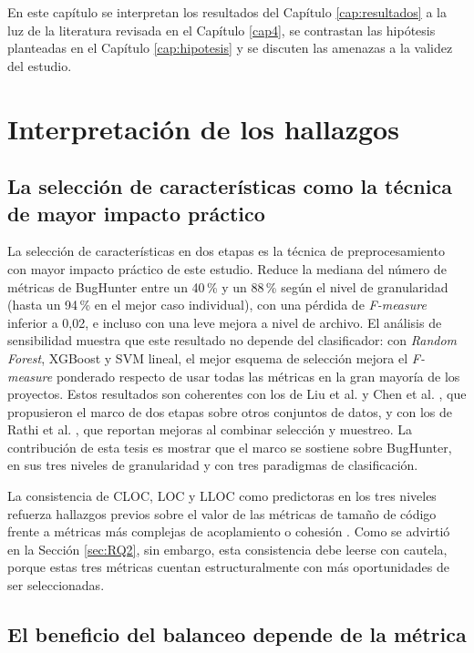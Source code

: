 En este capítulo se interpretan los resultados del Capítulo \ref{cap:resultados} a la luz de la literatura revisada en el Capítulo \ref{cap4}, se contrastan las hipótesis planteadas en el Capítulo \ref{cap:hipotesis} y se discuten las amenazas a la validez del estudio.

\section{Interpretación de los hallazgos}

\subsection{La selección de características como la técnica de mayor impacto práctico}

La selección de características en dos etapas es la técnica de preprocesamiento con mayor impacto práctico de este estudio. Reduce la mediana del número de métricas de BugHunter entre un 40\,\% y un 88\,\% según el nivel de granularidad (hasta un 94\,\% en el mejor caso individual), con una pérdida de \textit{F-measure} inferior a 0,02, e incluso con una leve mejora a nivel de archivo. El análisis de sensibilidad muestra que este resultado no depende del clasificador: con \textit{Random Forest}, XGBoost y SVM lineal, el mejor esquema de selección mejora el \textit{F-measure} ponderado respecto de usar todas las métricas en la gran mayoría de los proyectos. Estos resultados son coherentes con los de Liu et al. \cite{liu_empirical_2015} y Chen et al. \cite{chen_empirical_2013}, que propusieron el marco de dos etapas sobre otros conjuntos de datos, y con los de Rathi et al. \cite{rathi_empirical_2023}, que reportan mejoras al combinar selección y muestreo. La contribución de esta tesis es mostrar que el marco se sostiene sobre BugHunter, en sus tres niveles de granularidad y con tres paradigmas de clasificación.

La consistencia de CLOC, LOC y LLOC como predictoras en los tres niveles refuerza hallazgos previos sobre el valor de las métricas de tamaño de código frente a métricas más complejas de acoplamiento o cohesión \cite{RADJENOVIC20131397}. Como se advirtió en la Sección \ref{sec:RQ2}, sin embargo, esta consistencia debe leerse con cautela, porque estas tres métricas cuentan estructuralmente con más oportunidades de ser seleccionadas.

\subsection{El beneficio del balanceo depende de la métrica}


